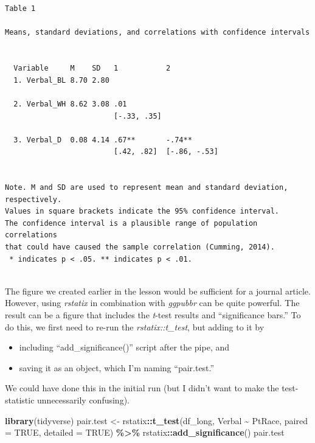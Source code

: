 \documentclass[
  11pt,
]{book}
\newenvironment{Shaded}{\begin{snugshade}}{\end{snugshade}}
\newcommand{\AttributeTok}[1]{\textcolor[rgb]{0.27,0.27,0.27}{#1}}
\newcommand{\ConstantTok}[1]{\textcolor[rgb]{0.37,0.37,0.37}{#1}}
\newcommand{\FunctionTok}[1]{\textcolor[rgb]{0.27,0.27,0.27}{\textbf{#1}}}
\newcommand{\NormalTok}[1]{#1}
\newcommand{\OtherTok}[1]{\textcolor[rgb]{0.37,0.37,0.37}{#1}}
\newcommand{\SpecialCharTok}[1]{\textcolor[rgb]{0.43,0.43,0.43}{\textbf{#1}}}
\providecommand{\tightlist}{%
  \setlength{\itemsep}{0pt}\setlength{\parskip}{0pt}}
\begin{document}
\begin{verbatim}


Table 1 

Means, standard deviations, and correlations with confidence intervals
 

  Variable     M    SD   1           2           
  1. Verbal_BL 8.70 2.80                         
                                                 
  2. Verbal_WH 8.62 3.08 .01                     
                         [-.33, .35]             
                                                 
  3. Verbal_D  0.08 4.14 .67**       -.74**      
                         [.42, .82]  [-.86, -.53]
                                                 

Note. M and SD are used to represent mean and standard deviation, respectively.
Values in square brackets indicate the 95% confidence interval.
The confidence interval is a plausible range of population correlations 
that could have caused the sample correlation (Cumming, 2014).
 * indicates p < .05. ** indicates p < .01.
 
\end{verbatim}

The figure we created earlier in the lesson would be sufficient for a journal article. However, using \emph{rstatix} in combination with \emph{ggpubbr} can be quite powerful. The result can be a figure that includes the \emph{t}-test results and ``significance bars.'' To do this, we first need to re-run the \emph{rstatix::t\_test}, but adding to it by

\begin{itemize}
\tightlist
\item
  including ``add\_significance()'' script after the pipe, and
\item
  saving it as an object, which I'm naming ``pair.test.''
\end{itemize}

We could have done this in the initial run (but I didn't want to make the test-statistic unnecessarily confusing).

\begin{Shaded}
\begin{Highlighting}[]
\FunctionTok{library}\NormalTok{(tidyverse)}
\NormalTok{pair.test }\OtherTok{\textless{}{-}}\NormalTok{ rstatix}\SpecialCharTok{::}\FunctionTok{t\_test}\NormalTok{(df\_long, Verbal }\SpecialCharTok{\textasciitilde{}}\NormalTok{ PtRace, }\AttributeTok{paired =} \ConstantTok{TRUE}\NormalTok{, }\AttributeTok{detailed =} \ConstantTok{TRUE}\NormalTok{) }\SpecialCharTok{\%\textgreater{}\%}
\NormalTok{    rstatix}\SpecialCharTok{::}\FunctionTok{add\_significance}\NormalTok{()}
\NormalTok{pair.test}
\end{Highlighting}
\end{Shaded}
\end{document}
